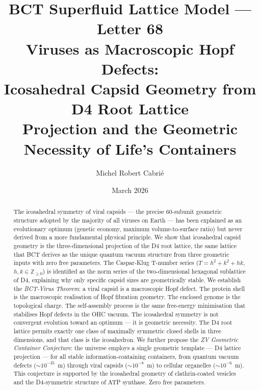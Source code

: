 \documentclass[aps,prl,preprint,superscriptaddress,floatfix]{revtex4-2}
\begin{document}
\title{BCT Superfluid Lattice Model --- Letter 68\\
Viruses as Macroscopic Hopf Defects:\\
Icosahedral Capsid Geometry from D4 Root Lattice\\
Projection and the Geometric Necessity of Life's Containers}

\author{Michel Robert Cabri\'e}
\date{March 2026}

\begin{abstract}
The icosahedral symmetry of viral capsids --- the precise 60-subunit
geometric structure adopted by the majority of all viruses on Earth ---
has been explained as an evolutionary optimum (genetic economy,
maximum volume-to-surface ratio) but never derived from a more
fundamental physical principle. We show that icosahedral capsid
geometry is the three-dimensional projection of the D4 root lattice,
the same lattice that BCT derives as the unique quantum vacuum
structure from three geometric inputs with zero free parameters.
The Caspar-Klug T-number series ($T = h^2 + k^2 + hk$, $h,k \in
\mathbb{Z}_{\geq 0}$) is identified as the norm series of the
two-dimensional hexagonal sublattice of D4, explaining why only
specific capsid sizes are geometrically stable.
We establish the \textit{BCT-Virus Theorem}: a viral capsid is a
macroscopic Hopf defect. The protein shell is the macroscopic
realisation of Hopf fibration geometry. The enclosed genome is the
topological charge. The self-assembly process is the same free-energy
minimisation that stabilises Hopf defects in the OHC vacuum.
The icosahedral symmetry is not convergent evolution toward an
optimum --- it is geometric necessity. The D4 root lattice permits
exactly one class of maximally symmetric closed shells in three
dimensions, and that class is the icosahedron. We further propose
the \textit{ZV Geometric Container Conjecture}: the universe employs
a single geometric template --- D4 lattice projection --- for all
stable information-containing containers, from quantum vacuum defects
($\sim 10^{-35}$~m) through viral capsids ($\sim 10^{-8}$~m) to
cellular organelles ($\sim 10^{-6}$~m). This conjecture is
supported by the icosahedral geometry of clathrin-coated vesicles
and the D4-symmetric structure of ATP synthase. Zero free parameters.
\end{abstract}

\maketitle
\end{document}
